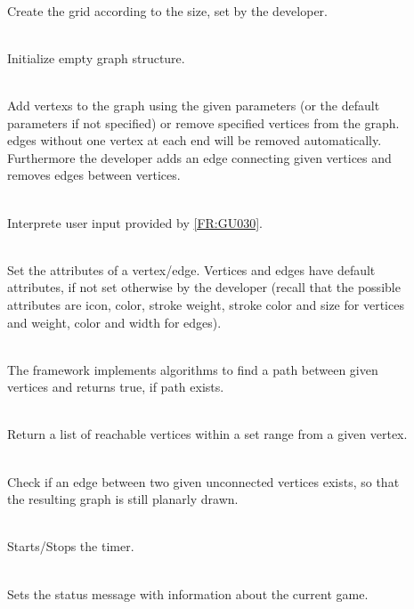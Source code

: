 \begin{description}
	\item[] \textbf{} \\
	Create the grid according to the size, set by the developer.
	\item[] \textbf{} \\
	Initialize empty graph structure.
	\item[] \textbf{} \\
	Add \glspl{vertex} to the graph using the given parameters (or the default parameters if not specified) or remove specified vertices from the graph. \Glspl{edge} without one vertex at each end will be removed automatically. Furthermore the developer adds an edge connecting given vertices and removes edges between vertices.
	\item[] \textbf{} \\
	Interprete user input provided by \ref{FR:GU030}.
	\item[] \textbf{} \\
	Set the attributes of a vertex/edge. Vertices and edges have default attributes, if not set otherwise by the developer (recall that the possible attributes are icon, color, stroke weight, stroke color and size for vertices and weight, color and width for edges).
	\item[] \textbf{} \\
	The framework implements algorithms to find a \gls{path} between given vertices and returns true, if path exists.
	\item[] \textbf{} \\
	Return a list of reachable vertices within a set range from a given vertex.
	\item[] \textbf{} \\
	Check if an edge between two given unconnected vertices exists, so that the resulting graph is still planarly drawn.
	\item[] \textbf{} \\
	Starts/Stops the timer.
	\item[] \textbf{} \\
	Sets the status message with information about the current game.
\end{description}


